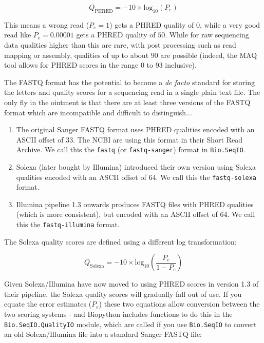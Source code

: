 \documentclass{report}
\begin{document}
\begin{equation}
Q_{\textrm{PHRED}} = - 10 \times \textrm{log}_{10} ( P_e )
\end{equation}

This means a wrong read ($P_e = 1$) gets a PHRED quality of $0$, while a very
good read like $P_e = 0.00001$ gets a PHRED quality of $50$. While for raw
sequencing data qualities higher than this are rare, with post processing
such as read mapping or assembly, qualities of up to about $90$ are possible
(indeed, the MAQ tool allows for PHRED scores in the range 0 to 93 inclusive).

The FASTQ format has the potential to become a \textit{de facto} standard for
storing the letters and quality scores for a sequencing read in a single plain
text file. The only fly in the ointment is that there are at least three
versions of the FASTQ format which are incompatible and difficult to
distinguish...

\begin{enumerate}
\item The original Sanger FASTQ format uses PHRED qualities encoded with an
ASCII offset of 33. The NCBI are using this format in their Short Read
Archive. We call this the \texttt{fastq} (or \texttt{fastq-sanger}) format
in \verb|Bio.SeqIO|.
\item Solexa (later bought by Illumina) introduced their own version using
Solexa qualities encoded with an ASCII offset of 64. We call this the
\texttt{fastq-solexa} format.
\item Illumina pipeline 1.3 onwards produces FASTQ files with PHRED qualities
(which is more consistent), but encoded with an ASCII offset of 64. We call
this the \texttt{fastq-illumina} format.
\end{enumerate}

The Solexa quality scores are defined using a different log transformation:

\begin{equation}
Q_{\textrm{Solexa}} = - 10 \times \textrm{log}_{10} \left( \frac{P_e}{1-P_e} \right)
\end{equation}

Given Solexa/Illumina have now moved to using PHRED scores in version 1.3 of
their pipeline, the Solexa quality scores will gradually fall out of use.
If you equate the error estimates ($P_e$) these two equations allow conversion
between the two scoring systems - and Biopython includes functions to do this
in the \verb|Bio.SeqIO.QualityIO| module, which are called if you use
\verb|Bio.SeqIO| to convert an old Solexa/Illumina file into a standard Sanger
FASTQ file:
\end{document}
